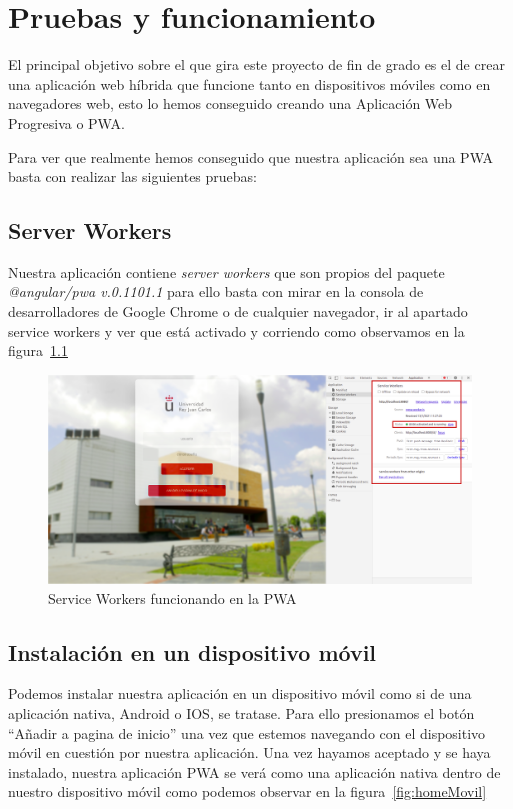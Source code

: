\documentclass[a4paper, 12pt]{book}
\begin{document}

\cleardoublepage
\chapter{Pruebas y funcionamiento}

El principal objetivo sobre el que gira este proyecto de fin de grado es el de crear una aplicación web híbrida que funcione tanto en dispositivos móviles como en navegadores web, esto lo hemos conseguido creando una Aplicación Web Progresiva o PWA. 

Para ver que realmente hemos conseguido que nuestra aplicación sea una PWA basta con realizar las siguientes pruebas: 

\section{Server Workers}
Nuestra aplicación contiene \textit{server workers} que son propios del paquete \textit{@angular/pwa v.0.1101.1} para ello basta con mirar en la consola de desarrolladores de Google Chrome o de cualquier navegador, ir al apartado service workers y ver que está activado y corriendo como observamos en la figura~\ref{fig:serviceWorker}
	
	\begin{figure}[h!]
  	\centering
  	\includegraphics[width=16cm, keepaspectratio]{img/principalWorker.png}
  	\caption{Service Workers funcionando en la PWA}\label{fig:serviceWorker}
	\end{figure}
	  
\section{Instalación en un dispositivo móvil}
Podemos instalar nuestra aplicación en un dispositivo móvil como si de una aplicación nativa, Android o IOS, se tratase. Para ello presionamos el botón ``Añadir a pagina de inicio'' una vez que estemos navegando con el dispositivo móvil en cuestión por nuestra aplicación.
	Una vez hayamos aceptado y se haya instalado, nuestra aplicación PWA se verá como una aplicación nativa dentro de nuestro dispositivo móvil como podemos observar en la figura~\ref{fig:homeMovil} 
 
\end{document}
